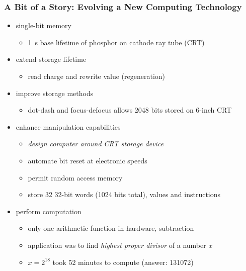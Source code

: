 \documentclass[handout]{beamer}
\begin{document}
\begin{frame}
  \frametitle{A Bit of a Story: Evolving a New Computing Technology}
  \begin{itemize}[<+->]
  \item  single-bit memory 
    \begin{itemize}[<6->]
    \item \SI{1}{\second} base lifetime of phosphor on cathode ray tube (CRT)
    \end{itemize}
  \item  extend storage lifetime 
    \begin{itemize}[<6->]
    \item read charge and rewrite value (regeneration)
    \end{itemize}
  \item improve storage methods 
    \begin{itemize}[<6->]
    \item dot-dash and focus-defocus allows 2048 bits stored on 6-inch CRT
    \end{itemize}
  \item enhance manipulation capabilities 
    \begin{itemize}[<6->]
    \item \textcolor{orange!80!black}{\emph{design computer around CRT storage device}}
    \item automate bit reset at electronic speeds 
    \item permit random access memory
    \item store 32 32-bit words (1024 bits total), values and instructions
    \end{itemize}
  \item perform computation 
    \begin{itemize}[<6->]
    \item only one arithmetic function in hardware, subtraction
    \item application was to find \emph{highest proper divisor} of a number $x$
    \item $x=2^{18}$ took 52 minutes to compute (answer: \num{131072})
    \end{itemize}
  \end{itemize}
\end{frame}
\end{document}
